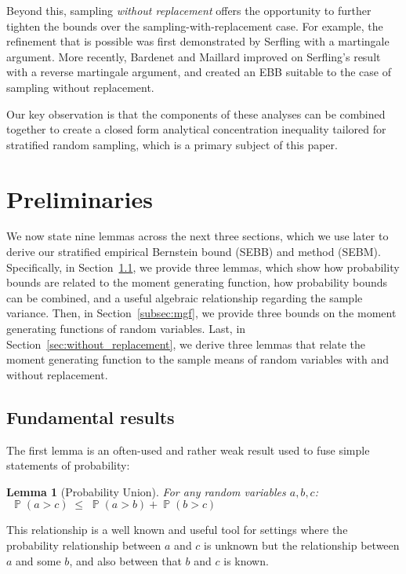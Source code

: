 \documentclass[]{interact}
\DeclareMathOperator{\pr}{\mathbb{P}}
\theoremstyle{plain}%
\newtheorem{lemma}[Theorem]{Lemma}
\theoremstyle{definition}
\theoremstyle{remark}
\begin{document}
Beyond this, sampling \textit{without replacement} offers the opportunity to further tighten the bounds over the sampling-with-replacement case. 
For example, the refinement that is possible was first demonstrated by Serfling \cite{serfling1974} with a martingale argument.
More recently, Bardenet and Maillard \cite{bardenet2015} improved on Serfling's result with a reverse martingale argument, and created an EBB suitable to the case of sampling without replacement.

Our key observation is that the components of these analyses can be combined together to create a closed form analytical concentration inequality tailored for stratified random sampling, which is a primary subject of this paper.


\section{Preliminaries}\label{sec:components}

We now state nine lemmas across the next three sections, which we use later to derive our stratified empirical Bernstein bound (SEBB) and method (SEBM). 
Specifically, in Section~\ref{subsec:fundamentals}, we provide three lemmas, which show how probability bounds are related to the moment generating function, how probability bounds can be combined, and a useful algebraic relationship regarding the sample variance.
Then, in Section~\ref{subsec:mgf}, we provide three bounds on the moment generating functions of random variables.
Last, in Section~\ref{sec:without_replacement}, we derive three lemmas that relate the moment generating function to the sample means of random variables with and without replacement.


\subsection{Fundamental results}\label{subsec:fundamentals}

The first lemma is an often-used and rather weak result used to fuse simple statements of probability:

\begin{lemma}[Probability Union]\label{prob_union}
For any random variables $a,b,c$:\\
$~~\pr(a>c) \; \le \; \pr(a>b) + \pr(b>c)$
\end{lemma}
\noindent
This relationship is a well known and useful tool for settings where the probability relationship between $a$ and $c$ is unknown but the relationship between $a$ and some $b$, and also between that $b$ and $c$ is known.
\end{document}
